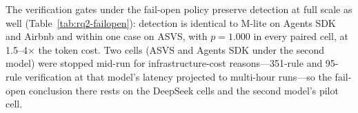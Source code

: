 \documentclass[11pt]{article}
\begin{document}
\begin{table}[t]
\centering
\caption{Verification gates under fail-open at full scale (paired M-lite vs.\
M-verified runs after the routing rework; $p$ = exact binomial McNemar on the
violation subset). Detection is preserved in every paired cell. React 19's
M-verified run was not rerun after the routing rework; its pilot comparison
appears in Table~\ref{tab:rq2}.}
\label{tab:rq2-failopen}

\end{table}

The verification gates under the fail-open policy preserve detection at full
scale as well (Table~\ref{tab:rq2-failopen}): detection is identical to M-lite
on Agents SDK and Airbnb and within one case on ASVS, with $p=1.000$ in every
paired cell, at 1.5--4$\times$ the token cost. Two cells (ASVS and Agents SDK
under the second model) were stopped mid-run for infrastructure-cost
reasons---351-rule and 95-rule verification at that model's latency projected
to multi-hour runs---so the fail-open conclusion there rests on the DeepSeek
cells and the second model's pilot cell.
\end{document}
